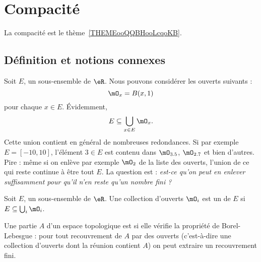 \section{Compacité}

La compacité est le thème~\ref{THEMEooQQBHooLcqoKB}.

\subsection{Définition et notions connexes}

Soit $E$, un sous-ensemble de $\eR$. Nous pouvons considérer les ouverts suivants :
\begin{equation}
	\mO_x=B(x,1)
\end{equation}
pour chaque $x\in E$. Évidemment,
\begin{equation}
	E\subseteq \bigcup_{x\in E}\mO_x.
\end{equation}
Cette union contient en général de nombreuses redondances. Si par exemple $E=[-10,10]$, l'élément $3\in E$ est contenu dans $\mO_{3.5}$, $\mO_{2.7}$ et bien d'autres. Pire : même si on enlève par exemple $\mO_2$ de la liste des ouverts, l'union de ce qui reste continue à être tout $E$. La question est : \emph{est-ce qu'on peut en enlever suffisamment pour qu'il n'en reste qu'un nombre fini ?}

\begin{definition}
	Soit $E$, un sous-ensemble de $\eR$. Une collection d'ouverts $\mO_i$ est un  de $E$ si $E\subseteq \bigcup_{i}\mO_i$.
\end{definition}

\begin{definition} \label{DefJJVsEqs}
	Une partie \( A\) d'un espace topologique est  si elle vérifie la propriété de Borel-Lebesgue : pour tout recouvrement de \( A\) par des ouverts (c'est-à-dire une collection d'ouverts dont la réunion contient \( A\)) on peut extraire un recouvrement fini.
\end{definition}

